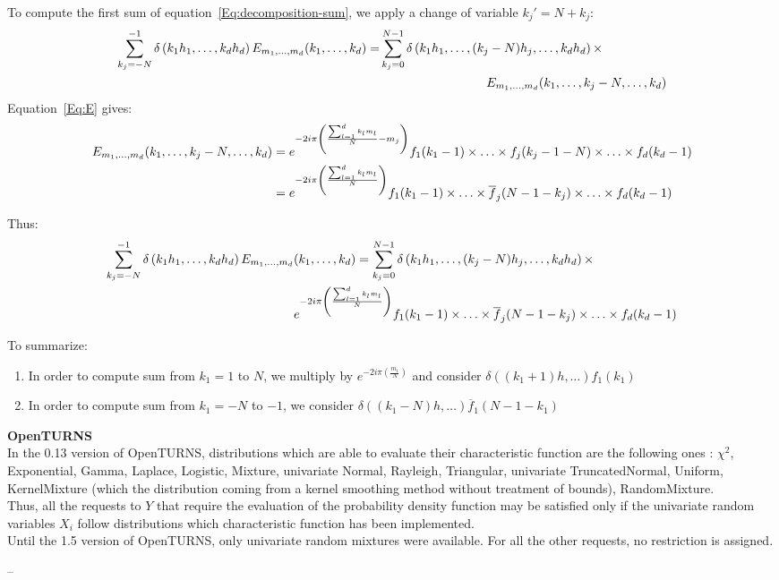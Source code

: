 {  To compute the first sum of equation~\eqref{Eq:decomposition-sum}, we apply a change of variable $k_j'=N+k_j$:
  \begin{align}
  \sum_{k_j=-N}^{-1}\delta\left(k_1h_1,\hdots,k_dh_d\right) E_{m_1,\hdots,m_d}(k_1,\hdots,k_d)
  = & \sum_{k_j=0}^{N-1}\delta\left(k_1h_1,\hdots,(k_j-N)h_j,\hdots,k_dh_d\right) \times\notag\\
    & \hspace*{3cm} E_{m_1,\hdots,m_d}(k_1,\hdots,k_j-N,\hdots,k_d)
  \end{align}
  Equation~\eqref{Eq:E} gives:
  \begin{align}
  E_{m_1,\hdots,m_d}(k_1,\hdots,k_j-N,\hdots,k_d) 
  &= 
      e^{-2i\pi\left(\frac{\sum_{l=1}^{d}k_l m_l}{N} -m_j\right)}
      f_1(k_1-1)\times\hdots\times f_j(k_j-1-N)\times\hdots\times f_d(k_d-1) \notag\\
  &= 
      e^{-2i\pi\left(\frac{\sum_{l=1}^{d}k_l m_l}{N}\right)}
      f_1(k_1-1)\times\hdots\times \overline{f}_j(N-1-k_j)\times\hdots\times f_d(k_d-1) 
  \end{align}

  Thus:
  \begin{align}
  \sum_{k_j=-N}^{-1}\delta\left(k_1h_1,\hdots,k_dh_d\right) E_{m_1,\hdots,m_d}&(k_1,\hdots,k_d)
    = \sum_{k_j=0}^{N-1}\delta\left(k_1h_1,\hdots,(k_j-N)h_j,\hdots,k_dh_d\right) \times\notag\\
    & e^{-2i\pi\left(\frac{\sum_{l=1}^{d}k_l m_l}{N}\right)}
      f_1(k_1-1)\times\hdots\times \overline{f}_j(N-1-k_j)\times\hdots\times f_d(k_d-1) \label{Eq:j-sigma-}
  \end{align}

  To summarize:
  \begin{enumerate}
  \item In order to compute sum from $k_1=1$ to $N$, we multiply by $e^{-2i\pi\left(\frac{m_1}{N}\right)}$ and consider $\delta((k_1+1)h,\hdots)f_1(k_1)$
  \item In order to compute sum from $k_1=-N$ to $-1$, we consider $\delta((k_1-N)h,\hdots)\overline{f}_1(N-1-k_1)$
  \end{enumerate}
  
  

  {\bf OpenTURNS}\\
  In the 0.13 version of OpenTURNS, distributions which are able to evaluate their characteristic function are the following ones :  $\chi^2$, Exponential, Gamma,  Laplace, Logistic, Mixture, univariate Normal, Rayleigh, Triangular, univariate TruncatedNormal, Uniform, KernelMixture (which the distribution coming from a kernel smoothing method without treatment of bounds), RandomMixture.\\
  Thus, all the requests to $Y$ that require the evaluation of the probability density function may be satisfied only if the univariate random variables $X_i$ follow distributions which characteristic function has been implemented.\\

  Until the 1.5 version of OpenTURNS, only univariate random mixtures were available.
  For all the other requests, no restriction is assigned.
}
{
  --
}


